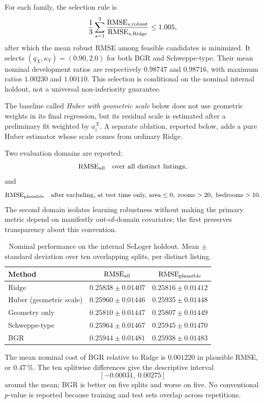 For each family, the selection rule is
\[
\frac13\sum_{s=1}^{3}
\frac{\mathrm{RMSE}_{s,\rm robust}}
     {\mathrm{RMSE}_{s,\rm Ridge}}
\le 1.005,
\]
after which the mean robust RMSE among feasible candidates is minimized. It selects $(q_X,\kappa_Y)=(0.90,2.0)$ for both BGR and Schweppe-type. Their mean nominal development ratios are respectively $0.98747$ and $0.98716$, with maximum ratios $1.00230$ and $1.00110$. This selection is conditional on the nominal internal holdout, not a universal non-inferiority guarantee.

The baseline called \emph{Huber with geometric scale} below does not use geometric weights in its final regression, but its residual scale is estimated after a preliminary fit weighted by $a_i^X$. A separate ablation, reported below, adds a pure Huber estimator whose scale comes from ordinary Ridge.

Two evaluation domains are reported:
\[
\mathrm{RMSE}_{\rm all}
\quad\text{over all distinct listings,}
\]
and
\[
\mathrm{RMSE}_{\rm plausible}
\quad\text{after excluding, at test time only, }
\text{area}\le0,\ \text{rooms}>20,\ \text{bedrooms}>10.
\]
The second domain isolates learning robustness without making the primary metric depend on manifestly out-of-domain covariates; the first preserves transparency about this convention.

\begin{table}[H]
\centering
\caption{Nominal performance on the internal SeLoger holdout. Mean $\pm$ standard deviation over ten overlapping splits, per distinct listing.}
\label{tab:seloger-nominal}
\small
\begin{tabular}{@{}lcc@{}}
\toprule
Method & $\mathrm{RMSE}_{\rm all}$ & $\mathrm{RMSE}_{\rm plausible}$ \\
\midrule
Ridge & $0.25838\pm0.01407$ & $0.25816\pm0.01412$ \\
Huber (geometric scale) & $0.25960\pm0.01446$ & $0.25935\pm0.01448$ \\
Geometry only & $0.25810\pm0.01447$ & $0.25807\pm0.01449$ \\
Schweppe-type & $0.25964\pm0.01467$ & $0.25945\pm0.01470$ \\
BGR & $0.25944\pm0.01481$ & $0.25938\pm0.01483$ \\
\bottomrule
\end{tabular}
\end{table}

The mean nominal cost of BGR relative to Ridge is $0.001220$ in plausible RMSE, or $0.47\,\%$. The ten splitwise differences give the descriptive interval
\[
[-0.00031,\ 0.00275]
\]
around the mean; BGR is better on five splits and worse on five. No conventional $p$-value is reported because training and test sets overlap across repetitions.

